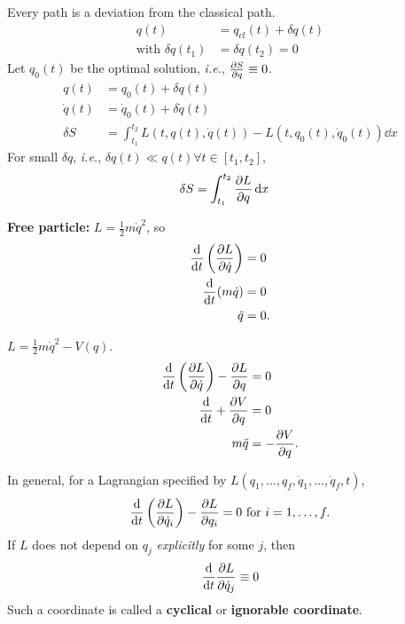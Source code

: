 
Every path is a deviation from the classical path. \begin{align*}
    q(t) &= q_{cl}(t) + \delta q(t) \\
    \text{with } \delta q(t_{1}) &= \delta q(t_{2}) = 0
\end{align*}
Let $q_{0}(t)$ be the optimal solution, \textit{i.e.}, $\pdv{S}{q} \equiv 0$.
\begin{align*}
    q(t) &= q_{0}(t) + \delta q(t) \\
    \dot{q}(t) &= \dot{q}_{0}(t) + \delta \dot{q}(t) \\
    \delta S &= \int_{t_{1}}^{t_{2}}
        L(t, q(t), \dot{q}(t)) - L(t, q_{0}(t), \dot{q}_{0} (t)) \dd x
\end{align*}
For small $\delta q$, \textit{i.e.},
$\delta q(t) \ll q(t) \forall t \in [t_{1}, t_{2}]$,
\begin{align*}
    \delta S &= \int_{t_{1}}^{t_{2}} \pdv{L}{q}(t, q_{0}(t), \dot{q}_{0}(t)) \dd x
\end{align*}
\begin{examples}
    \item \textbf{Free particle:} $L = \frac{1}{2} m \dot{q}^{2}$, so
        \begin{align*}
            \dv{}{t}\left(\pdv{L}{\dot{q}}\right) &= 0 \\
            \dv{}{t}{}(m \dot{q}) &= 0 \\ %
            \ddot{q} &= 0.
        \end{align*}
    \item $L = \frac{1}{2} m \dot{q}^{2} - V(q)$.
        \begin{align*}
            \dv{}{t}\left(\pdv{L}{\dot{q}}\right) - \pdv{L}{q} &= 0 \\
            \dv{}{t}(m \dot{q}) + \pdv{V}{q} &= 0 \\
            m \ddot{q} &= - \pdv{V}{q}.
        \end{align*}
\end{examples}

In general, for a Lagrangian specified by
$L(q_{1}, \dots, q_{f}, \dot{q}_{1}, \dots, \dot{q}_{f}, t)$, \[
    \dv{}{t}\left(\pdv{L}{\dot{q}_{i}}\right) - \pdv{L}{q_{i}} = 0 \text{ for } i = 1, \dots, f.
\] If $L$ does not depend on $q_{j}$ \emph{explicitly} for some $j$, then \[
    \dv{}{t} \pdv{L}{\dot{q}_{j}} \equiv 0
\] Such a coordinate is called a \textbf{cyclical} or \textbf{ignorable coordinate}.

